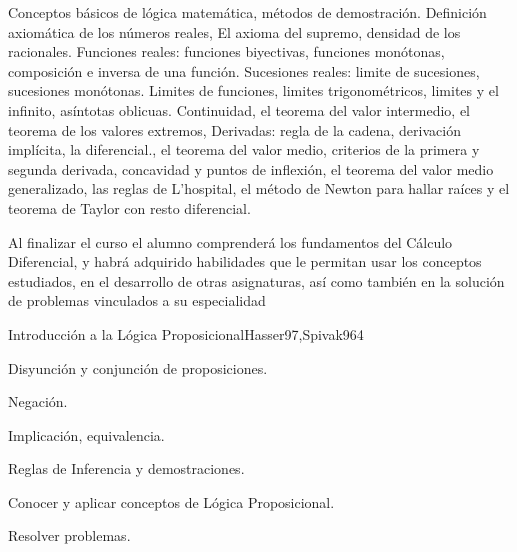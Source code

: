 \begin{syllabus}


\begin{justification}
Conceptos básicos de lógica matemática, métodos de demostración. Definición axiomática de los números reales, El axioma del supremo, densidad de los racionales. Funciones reales: funciones biyectivas, funciones monótonas, composición e inversa de una función. Sucesiones reales: limite de sucesiones, sucesiones monótonas.  Limites de funciones, limites trigonométricos, limites y el infinito, así­ntotas  oblicuas. Continuidad, el teorema del valor intermedio, el teorema de los valores extremos, Derivadas: regla de la cadena, derivación implícita, la diferencial., el teorema del valor medio, criterios de la primera y segunda derivada, concavidad y puntos de inflexión, el teorema del valor medio generalizado, las reglas de L'hospital, el método de Newton para hallar raíces y el  teorema de Taylor  con resto diferencial.
\end{justification}

\begin{goals}
\item Al finalizar el curso el alumno comprenderá los fundamentos del Cálculo Diferencial, y habrá adquirido habilidades que le permitan usar los conceptos estudiados, en el desarrollo de otras asignaturas, así­ como también en la solución de problemas vinculados a su especialidad 
\end{goals}

\begin{outcomes}
\end{outcomes}

\begin{unit}{Introducción a la Lógica Proposicional}{Hasser97,Spivak96}{4}
\begin{topics}
      \item Disyunción y conjunción de proposiciones.
      \item Negación.
      \item Implicación, equivalencia.
      \item Reglas de Inferencia y demostraciones.
   \end{topics}

   \begin{unitgoals}
      \item Conocer y aplicar conceptos de Lógica Proposicional.
	\item Resolver problemas.
   \end{unitgoals}
\end{unit}


\end{syllabus}
